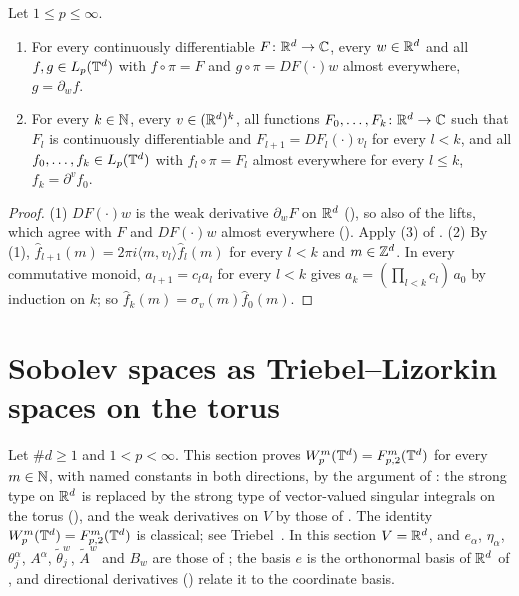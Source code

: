 \begin{theorem}
\label{thm:torus-classical-derivative}
\leanok
{}
Let $1 \leq p \leq \infty$.
\begin{enumerate}
  \item For every continuously differentiable $F \colon \mathbb{R}^d \to \mathbb{C}$, every $w \in \mathbb{R}^d$ and all
    $f, g \in L_p(\mathbb{T}^d)$ with $f \circ \pi = F$ and $g \circ \pi = DF(\cdot) w$ almost
    everywhere, $g = \partial_w f$.
  \item For every $k \in \mathbb{N}$, every $v \in (\mathbb{R}^d)^k$, all functions
    $F_0, \dots, F_k \colon \mathbb{R}^d \to \mathbb{C}$ such that $F_l$ is continuously differentiable and
    $F_{l+1} = DF_l(\cdot) v_l$ for every $l < k$, and all $f_0, \dots, f_k \in L_p(\mathbb{T}^d)$ with
    $f_l \circ \pi = F_l$ almost everywhere for every $l \leq k$, $f_k = \partial^v f_0$.
\end{enumerate}
\end{theorem}

\begin{proof}
\leanok
(1) $DF(\cdot) w$ is the weak derivative $\partial_w F$ on $\mathbb{R}^d$
(), so also of the lifts, which agree with $F$ and
$DF(\cdot) w$ almost everywhere (). Apply (3) of
. (2) By (1),
$\hat f_{l+1}(m) = 2\pi i \langle m, v_l \rangle \hat f_l(m)$ for every $l < k$ and $m \in \mathbb{Z}^d$.
In every commutative monoid, $a_{l+1} = c_l a_l$ for every $l < k$ gives
$a_k = (\prod_{l < k} c_l) \, a_0$ by induction on $k$; so
$\hat f_k(m) = \sigma_v(m) \hat f_0(m)$.
\end{proof}

\section{Sobolev spaces as Triebel--Lizorkin spaces on the torus}
\label{sec:torus-sobolev-triebel-lizorkin}

Let $\#d \geq 1$ and $1 < p < \infty$. This section proves
$W^{m}_{p}(\mathbb{T}^d) = F^{m}_{p,2}(\mathbb{T}^d)$ for every $m \in \mathbb{N}$, with named constants in both
directions, by the argument of : the strong type on $\mathbb{R}^d$ is
replaced by the strong type of vector-valued singular integrals on the torus
(), and the weak derivatives on $V$ by those of
. The identity $W^{m}_{p}(\mathbb{T}^d) = F^{m}_{p,2}(\mathbb{T}^d)$ is
classical; see Triebel~\cite{Triebel}. In this section $V = \mathbb{R}^d$, and $e_\alpha$, $\eta_\alpha$,
$\theta^\alpha_j$, $A^\alpha$, $\tilde\theta^w_j$, $\tilde A^w$ and $B_w$ are those of
; the basis $e$ is the orthonormal basis of $\mathbb{R}^d$ of
, and directional derivatives () relate
it to the coordinate basis.

